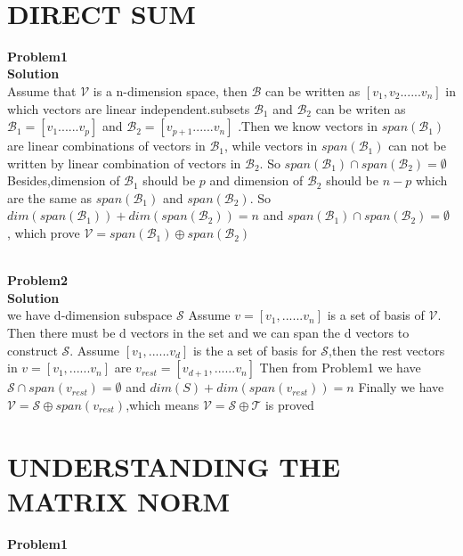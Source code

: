 \documentclass[english,onecolumn,UTF8]{IEEEtran}
\begin{document}
~\\

\section{DIRECT SUM}

\noindent\textbf{Problem1}\\
\textbf{Solution}\\
Assume that $\mathcal{V}$ is a n-dimension space, then $\mathcal{B}$ can be written as $[v_{1},v_{2}......v_{n}]$ in which vectors are linear independent.subsets $\mathcal{B}_{1}$ and $\mathcal{B}_{2}$ can be writen as $\mathcal{B}_{1}=[v_{1}......v_{p}]$ and $\mathcal{B}_{2}=[v_{p+1}......v_{n}]$ .Then we know vectors in $span(\mathcal{B}_{1})$ are linear combinations of vectors in $\mathcal{B}_{1}$, while vectors in $span(\mathcal{B}_{1})$ can not be written by linear combination of vectors in $\mathcal{B}_{2}$. So $span(\mathcal{B}_{1}) \cap span(\mathcal{B}_{2})= \emptyset$
Besides,dimension of $\mathcal{B}_{1}$ should be $p$ and dimension of $\mathcal{B}_{2}$ should be  $n-p$ which are the same as $span(\mathcal{B}_{1})$ and $span(\mathcal{B}_{2})$.
So $dim(span(\mathcal{B}_{1}))+dim(span(\mathcal{B}_{2}))=n$ and $span(\mathcal{B}_{1}) \cap span(\mathcal{B}_{2})= \emptyset$ , which prove $\mathcal{V}=span(\mathcal{B}_{1}) \oplus span(\mathcal{B}_{2})$

~\\
\textbf{Problem2}\\
\textbf{Solution}\\

we have d-dimension subspace $\mathcal{S}$
Assume $v=[v_{1},......v_{n}]$ is a set of basis of $\mathcal{V}$. Then there must be d vectors in the set and we can span the d vectors  to construct $\mathcal{S}$. Assume $[v_{1},......v_{d}]$ is the a set of basis for $\mathcal{S}$,then the rest vectors in $v=[v_{1},......v_{n}]$ are $v_{rest}=[v_{d+1},......v_{n}]$
Then from Problem1 we have 
$\mathcal{S} \cap span(v_{rest})=\emptyset $
and $dim(S)+dim(span(v_{rest}))=n$ 
Finally we have $\mathcal{V}=\mathcal{S} \oplus span(v_{rest})$,which means $\mathcal{V}=\mathcal{S} \oplus \mathcal{T}$ is proved
~\\
\section{UNDERSTANDING THE MATRIX NORM}

\textbf{Problem1}
\end{document}
